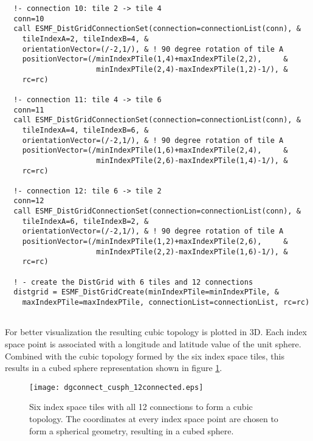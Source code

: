 \begin{verbatim}
  !- connection 10: tile 2 -> tile 4
  conn=10
  call ESMF_DistGridConnectionSet(connection=connectionList(conn), &
    tileIndexA=2, tileIndexB=4, &
    orientationVector=(/-2,1/), & ! 90 degree rotation of tile A
    positionVector=(/minIndexPTile(1,4)+maxIndexPTile(2,2),     &
                     minIndexPTile(2,4)-maxIndexPTile(1,2)-1/), &
    rc=rc)

  !- connection 11: tile 4 -> tile 6
  conn=11
  call ESMF_DistGridConnectionSet(connection=connectionList(conn), &
    tileIndexA=4, tileIndexB=6, &
    orientationVector=(/-2,1/), & ! 90 degree rotation of tile A
    positionVector=(/minIndexPTile(1,6)+maxIndexPTile(2,4),     &
                     minIndexPTile(2,6)-maxIndexPTile(1,4)-1/), &
    rc=rc)

  !- connection 12: tile 6 -> tile 2
  conn=12
  call ESMF_DistGridConnectionSet(connection=connectionList(conn), &
    tileIndexA=6, tileIndexB=2, &
    orientationVector=(/-2,1/), & ! 90 degree rotation of tile A
    positionVector=(/minIndexPTile(1,2)+maxIndexPTile(2,6),     &
                     minIndexPTile(2,2)-maxIndexPTile(1,6)-1/), &
    rc=rc)
  
  ! - create the DistGrid with 6 tiles and 12 connections
  distgrid = ESMF_DistGridCreate(minIndexPTile=minIndexPTile, &
    maxIndexPTile=maxIndexPTile, connectionList=connectionList, rc=rc)
 
\end{verbatim}
 

   For better visualization the resulting cubic topology is plotted in 3D.
   Each index space point is associated with a longitude and latitude value
   of the unit sphere. Combined with the cubic topology formed by the six 
   index space tiles, this results in a cubed sphere representation shown in
   figure \ref{fig:dgconnect_cusph_12connected}.
  
   \begin{figure}[h]
     \caption{Six index space tiles with all 12 connections to form a cubic
      topology. The coordinates at every index space point are chosen to 
      form a spherical geometry, resulting in a cubed sphere.}
     \centering
     \texttt{[image: dgconnect\_cusph\_12connected.eps]}
     \label{fig:dgconnect_cusph_12connected}
   \end{figure}
  
\setlength{\parskip}{\oldparskip}
\setlength{\parindent}{\oldparindent}
\setlength{\baselineskip}{\oldbaselineskip}
